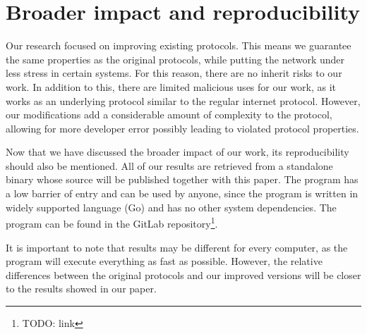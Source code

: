 \section{Broader impact and reproducibility}
\label{broader-impact}

Our research focused on improving existing protocols. This means we guarantee the same properties as the original protocols, while putting the network under less stress in certain systems. For this reason, there are no inherit risks to our work. In addition to this, there are limited malicious uses for our work, as it works as an underlying protocol similar to the regular internet protocol. 
However, our modifications add a considerable amount of complexity to the protocol, allowing for more developer error possibly leading to violated protocol properties.


Now that we have discussed the broader impact of our work, its reproducibility should also be mentioned. All of our results are retrieved from a standalone binary whose source will be published together with this paper. The program has a low barrier of entry and can be used by anyone, since the program is written in widely supported language (Go) and has no other system dependencies. The program can be found in the GitLab repository\footnote{TODO: link}.


It is important to note that results may be different for every computer, as the program will execute everything as fast as possible. However, the relative differences between the original protocols and our improved versions will be closer to the results showed in our paper.

